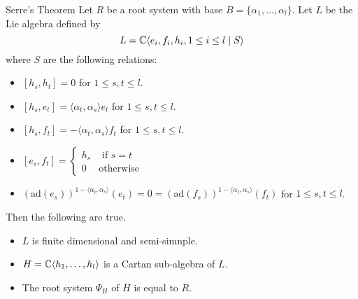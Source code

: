 \documentclass[a4paper]{article}
\begin{document}
\begin{thm}{Serre's Theorem}{} Let $R$ be a root system with base $B=\{\alpha_1,\dots,\alpha_l\}$. Let $L$ be the Lie algebra defined by $$L=\mathbb{C}\langle e_i,f_i,h_i, 1\leq i\leq l\;|\;S\rangle$$ where $S$ are the following relations: 
\begin{itemize}
\item $[h_s,h_t]=0$ for $1\leq s,t\leq l$. 
\item $[h_s,e_t]=\langle\alpha_t,\alpha_s\rangle e_t$ for $1\leq s,t\leq l$. 
\item $[h_s,f_t]=-\langle\alpha_t,\alpha_s\rangle f_t$ for $1\leq s,t\leq l$. 
\item $[e_s,f_t]=\begin{cases}
h_s & \text{ if } s=t\\
0 & \text{otherwise}
\end{cases}$
\item $\left(\text{ad}(e_s)\right)^{1-\langle\alpha_t,\alpha_s\rangle}(e_t)=0=\left(\text{ad}(f_s)\right)^{1-\langle\alpha_t,\alpha_s\rangle}(f_t)$ for $1\leq s,t\leq l$. 
\end{itemize}
Then the following are true. 
\begin{itemize}
\item $L$ is finite dimensional and semi-simnple. 
\item $H=\mathbb{C}\langle h_1,\dots,h_l\rangle$ is a Cartan sub-algebra of $L$. 
\item The root system $\Psi_H$ of $H$ is equal to $R$. 
\end{itemize}
\end{thm}
\end{document}
